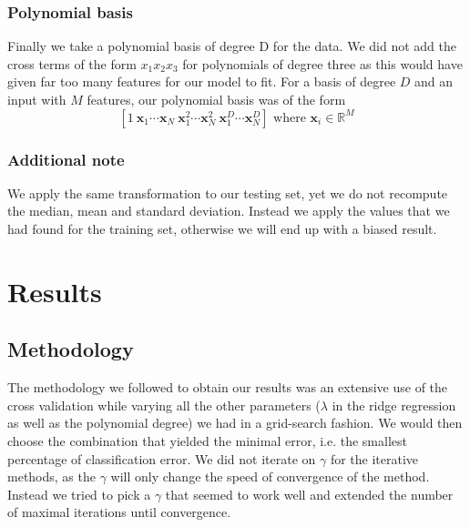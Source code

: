 \documentclass[10pt,conference,compsocconf]{IEEEtran}
\begin{document}
\subsubsection{Polynomial basis} 
Finally we take a polynomial basis of degree D for the data. We did not add the cross terms of the form $x_1x_2x_3$ for polynomials of degree three as this would have given far too many features for our model to fit. For a basis of degree $D$ and an input with $M$ features, our polynomial basis was of the form 
\begin{equation}
\left[1 ~ \mathbf{x}_1 \cdots \mathbf{x}_N ~\mathbf{x}_1^2 \cdots \mathbf{x}_N^2 ~ \mathbf{x}_1^D \cdots \mathbf{x}_N^D \right] \mbox{ where } \mathbf{x}_i \in \mathbb{R}^M
\end{equation}
\subsubsection{Additional note}
We apply the same transformation to our testing set, yet we do not recompute the median, mean and standard deviation. Instead we apply the values that we had found for the training set, otherwise we will end up with a biased result. 
\section{Results}
\subsection{Methodology}
The methodology we followed to obtain our results was an extensive use of the cross validation while varying all the other parameters ($\lambda$ in the ridge regression as well as the polynomial degree) we had in a grid-search fashion. We would then choose the combination that yielded the minimal error, i.e. the smallest percentage of classification error. We did not iterate on $\gamma$ for the iterative methods, as the $\gamma$ will only change the speed of convergence of the method. Instead we tried to pick a $\gamma$ that seemed to work well and extended the number of maximal iterations until convergence.
\end{document}
